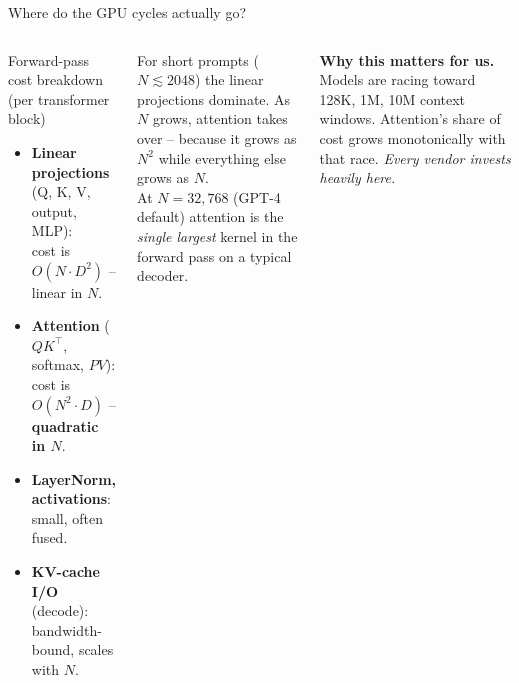 \documentclass[10pt,aspectratio=169]{beamer}
\begin{document}
\begin{frame}{Where do the GPU cycles actually go?}
  \begin{columns}[T]
      \begin{block}{Forward-pass cost breakdown (per transformer block)}
        \begin{itemize}
          \item \textbf{Linear projections} (Q, K, V, output, MLP):\\
                cost is $O(N \cdot D^2)$ -- linear in $N$.
          \item \textbf{Attention} ($Q K^\top$, softmax, $P V$):\\
                cost is $O(N^2 \cdot D)$ -- \textbf{quadratic in $N$}.
          \item \textbf{LayerNorm, activations}: small, often fused.
          \item \textbf{KV-cache I/O} (decode): bandwidth-bound, scales
                with $N$.
        \end{itemize}
      \end{block}
      \begin{spoiler}
        For short prompts ($N \lesssim 2048$) the linear projections
        dominate. As $N$ grows, attention takes over -- because it
        grows as $N^2$ while everything else grows as $N$.\\[4pt]
        At $N = 32{,}768$ (GPT-4 default) attention is the
        \emph{single largest} kernel in the forward pass on a typical
        decoder.
      \end{spoiler}
      \vspace{0.4em}
      \textbf{Why this matters for us.} Models are racing toward 128K,
      1M, 10M context windows. Attention's share of cost grows
      monotonically with that race. \emph{Every vendor invests heavily
      here.}
  \end{columns}
\end{frame}
\end{document}
